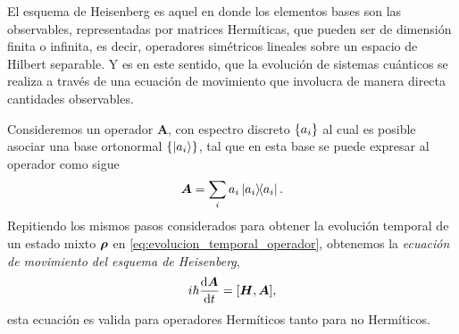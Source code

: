 \documentclass[../Main.tex]{subfiles}
\begin{document}
El esquema de Heisenberg es aquel en  donde los elementos bases son las observables, representadas por matrices Hermíticas, que pueden ser de dimensión finita o infinita, es decir, operadores simétricos lineales sobre un espacio de Hilbert separable. Y es en este sentido, que la evolución de sistemas cuánticos se realiza a través de una ecuación de movimiento que involucra de manera directa cantidades observables.

Consideremos un operador $\bm{A}$, con espectro discreto $\qty{a_i}$ al cual es posible asociar una base ortonormal $\qty{\ket{a_i}}$, tal que en esta base se puede expresar al operador como sigue
\begin{equation}
    \bm{A}=\sum_i a_i \op{a_i}.
    \label{def:operador_eigne_vectores}
\end{equation}
Repitiendo los mismos pasos considerados para obtener la evolución temporal de un estado mixto $\bm{\rho}$ en \eqref{eq:evolucion_temporal_operador}, obtenemos la \emph{ecuación de movimiento del esquema de Heisenberg},
\begin{equation}
    i\hbar \dv{\bm{A}}{t}=\qty[\bm{H},\bm{A}],
    \label{eq:evolucion_temporal_Heisenberg}
\end{equation}
esta ecuación es valida para operadores Hermíticos tanto para no Hermíticos.
\end{document}
